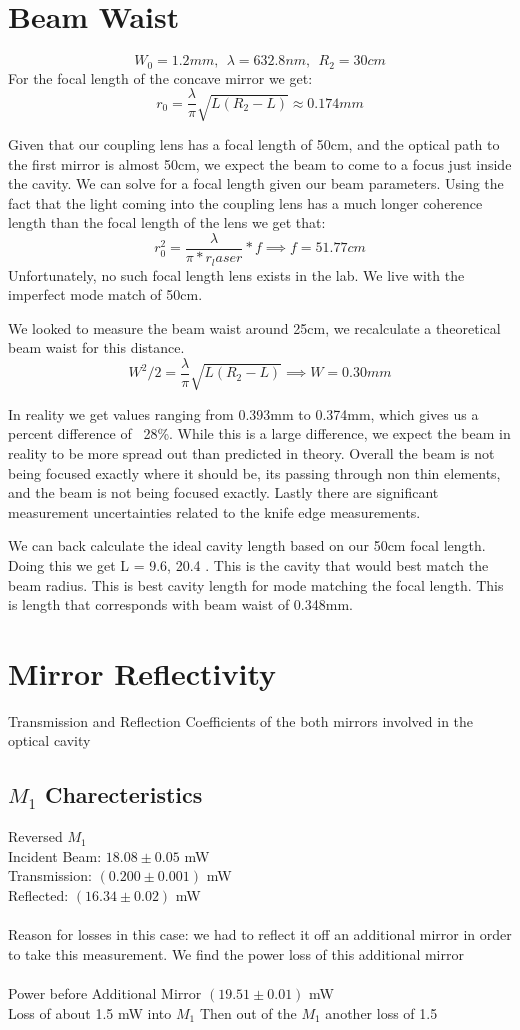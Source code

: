 \documentclass[11pt]{article}
\begin{document}
\section{Beam Waist}
$$W_0 = 1.2mm,\ \ \lambda = 632.8nm, \ \ R_2 = 30cm$$
For the focal length of the concave mirror we get:
$$ r_0 = \frac{\lambda}{\pi}\sqrt{L(R_2-L)} \approx 0.174mm$$

Given that our coupling lens has a focal length of 50cm, and the optical path to the first mirror is almost 50cm, we expect the beam to come to a focus just inside the cavity. We can solve for a focal length given our beam parameters. Using the fact that the light coming into the coupling lens has a much longer coherence length than the focal length of the lens we get that:
$$ r_0^2 = \frac{\lambda}{\pi * r_laser}*f \implies f = 51.77cm$$ 
Unfortunately, no such focal length lens exists in the lab. We live with the imperfect mode match of 50cm. 

We looked to measure the beam waist around 25cm, we recalculate a theoretical beam waist for this distance. 
$$ W^2/2 = \frac{\lambda}{\pi}\sqrt{L(R_2-L)} \implies W = 0.30mm$$

In reality we get values ranging from 0.393mm to 0.374mm, which gives us a percent difference of ~28\%. While this is a large difference, we expect the beam in reality to be more spread out than predicted in theory. Overall the beam is not being focused exactly where it should be, its passing through non thin elements, and the beam is not being focused exactly. Lastly there are significant measurement uncertainties related to the knife edge measurements. 

We can back calculate the ideal cavity length based on our 50cm focal length. Doing this we get L = 9.6, 20.4 . This is the cavity that would best match the beam radius. This is best cavity length for mode matching the focal length. This is length that corresponds with beam waist of 0.348mm. 

\section{Mirror Reflectivity}
Transmission and Reflection Coefficients of the both mirrors involved in the optical cavity \\
\subsection{$M_1$ Charecteristics}
Reversed $M_1$ \\ 
Incident Beam:
$18.08 \pm 0.05$ mW \\
Transmission:
$(0.200 \pm 0.001 )$ mW \\
Reflected: 
$(16.34 \pm 0.02)$ mW \\ \ \\
Reason for losses in this case: we had to reflect it off an additional mirror in order to take this measurement. We find the power loss of this additional mirror \\ \ \\ 
Power before Additional Mirror
$(19.51 \pm 0.01)$ mW \\
Loss of about 1.5 mW into $M_1$ 
Then out of the $M_1$ another loss of 1.5 \\
\end{document}
